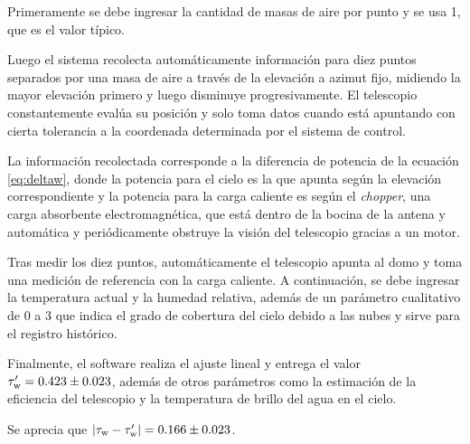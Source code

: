 Primeramente se debe ingresar la cantidad de masas de aire por punto y se usa \num{1}, que es el valor típico.

Luego el sistema recolecta automáticamente información para diez puntos separados por una masa de aire a través de la elevación a azimut fijo, midiendo la mayor elevación primero y luego disminuye progresivamente. El telescopio constantemente evalúa su posición y solo toma datos cuando está apuntando con cierta tolerancia a la coordenada determinada por el sistema de control.

La información recolectada corresponde a la diferencia de potencia de la ecuación \ref{eq:deltaw}, donde la potencia para el cielo es la que apunta según la elevación correspondiente y la potencia para la carga caliente es según el \textit{chopper}, una carga absorbente electromagnética, que está dentro de la bocina de la antena y automática y periódicamente obstruye la visión del telescopio gracias a un motor.

Tras medir los diez puntos, automáticamente el telescopio apunta al domo y toma una medición de referencia con la carga caliente. A continuación, se debe ingresar la temperatura actual y la humedad relativa, además de un parámetro cualitativo de \num{0} a \num{3} que indica el grado de cobertura del cielo debido a las nubes y sirve para el registro histórico.

Finalmente, el software realiza el ajuste lineal y entrega el valor $\tau_\textnormal{w}'=0.423\pm0.023$, además de otros parámetros como la estimación de la eficiencia del telescopio y la temperatura de brillo del agua en el cielo.

Se aprecia que $\abs{\tau_\textnormal{w}-\tau_\textnormal{w}'}=0.166\pm0.023$.